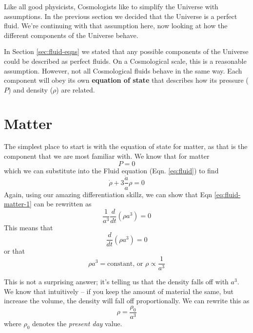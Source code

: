 \documentclass[11pt,a4paper]{book}
\begin{document}
Like all good physicists, Cosmologists like to simplify the Universe
with assumptions. In the previous section we decided that the Universe
is a perfect fluid. We're continuing with that assumption here, now
looking at how the different components of the Universe behave.

In Section \ref{sec:fluid-eqns} we stated that any possible components of
the Universe could be described as perfect fluids. On a Cosmological
scale, this is a reasonable assumption. However, not all Cosmological
fluids behave in the same way. Each component will obey its own
\textbf{equation of state} that describes how its pressure (\(P\)) and density
(\(\rho\)) are related.

\hypertarget{sec:matter-eos}{%
\section{Matter}\label{sec:matter-eos}}

The simplest place to start is with the equation of state for matter, as
that is the component that we are most familiar with. We know that for
matter \[P = 0\] which we can substitute into the Fluid equation (Eqn. \eqref{eq:fluid}) to find
\begin{equation}
    \dot{\rho} + 3\dfrac{\dot{a}}{a}\rho = 0
\label{eq:fluid-matter-1}
\end{equation}
Again, using our amazing
differentiation skillz, we can show that Eqn \eqref{eq:fluid-matter-1} can be rewritten as
\begin{equation}
\dfrac{1}{a^3}\dfrac{d}{dt}\left(\rho a^3\right) = 0
\label{eq:fluid-matter-2}
\end{equation}
This means that
\begin{equation}
\dfrac{d}{dt}\left(\rho a^3\right) = 0
\label{eq:fluid-matter-2}
\end{equation}
or that
\begin{equation}
    \rho a^3 = \text{constant,} \text{ or }\rho \propto \dfrac{1}{a^3}
    \label{eq:fluid-matter-3}
\end{equation}

This is not a surprising answer; it's telling us that the density falls
off with \(a^3\). We know that intuitively -- if you keep the amount of
material the same, but increase the volume, the density will fall off
proportionally. We can rewrite this as
\begin{equation}
\rho = \dfrac{\rho_0}{a^3}
\label{eq:fluid-matter-4}
\end{equation}
where \(\rho_0\) denotes the \emph{present day} value.
\end{document}
